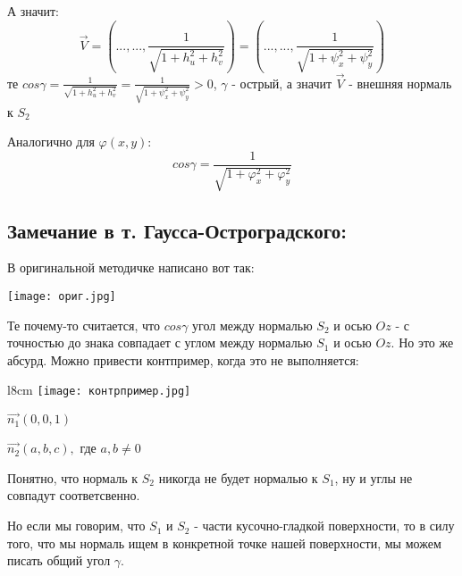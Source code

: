 \documentclass[12pt, english]{article}
\begin{document}
А значит:
$$
\vec{V} = ( ..., ... , \frac{1}{\sqrt{1+h_u^2 + h_v^2}})
=
( ..., ... , \frac{1}{\sqrt{1+\psi_x^2 + \psi_y^2}})
$$
те $cos\gamma = \frac{1}{\sqrt{1+h_u^2 + h_v^2}} = \frac{1}{\sqrt{1+\psi_x^2 + \psi_y^2}}> 0$, $\gamma$ - острый, а значит $\vec{V}$ - внешняя нормаль к $S_2$

Аналогично для $\varphi(x,y)$:
$$cos\gamma = \frac{1}{\sqrt{1 + \varphi_x^2 + \varphi_y^2 }} $$

\subsection{Замечание в т. Гаусса-Остроградского:}\label{eq11}
	В оригинальной методичке написано вот так:
	
	\texttt{[image: ориг.jpg]}	
	
	Те почему-то считается, что $cos\gamma$ угол между нормалью $S_2$ и осью $Oz$ - с точностью до знака совпадает с углом между нормалью $S_1$ и осью $Oz$. Но это же абсурд. Можно привести контпример, когда это не выполняется:
	
	\begin{wrapfigure}{l}{8cm}
	\texttt{[image: контрпример.jpg]}
	\end{wrapfigure}
	
	$\vec{n_1}(0 , 0 , 1)$
	
	$\vec{n_2}(a , b , c), $ где $a,b \neq 0$

	Понятно, что нормаль к $S_2$ никогда не будет нормалью к $S_1$, ну и углы не совпадут соответсвенно.
	
	Но если мы говорим, что $S_1$ и $S_2$ - части кусочно-гладкой поверхности, то в силу того, что мы нормаль ищем в конкретной точке нашей поверхности, мы можем писать общий угол $\gamma$.
\end{document}
